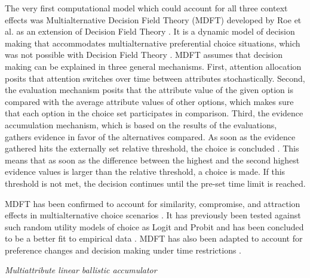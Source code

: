 \documentclass[a4paper,12pt]{article}
\newcommand{\citeyearonly}[1]{\citeyearpar{#1}}
\begin{document}
The very first computational model which could account for all three context effects was Multialternative Decision Field Theory (MDFT) developed by Roe et al. \citeyearonly{roe2001multialternative} as an extension of Decision Field Theory \citep{busemeyer1993decision}. It is a dynamic model of decision making that accommodates multialternative preferential choice situations, which was not possible with Decision Field Theory \citep{hotaling2019quantitative}. MDFT assumes that decision making can be explained in three general mechanisms. First, attention allocation posits that attention switches over time between attributes stochastically. Second, the evaluation mechanism posits that the attribute value of the given option is compared with the average attribute values of other options, which makes sure that each option in the choice set participates in comparison. Third, the evidence accumulation mechanism, which is based on the results of the evaluations, gathers evidence in favor of the alternatives compared. As soon as the evidence gathered hits the externally set relative threshold, the choice is concluded \citep{busemeyer2002survey}. This means that as soon as the difference between the highest and the second highest evidence values is larger than the relative threshold, a choice is made. If this threshold is not met, the decision continues until the pre-set time limit is reached.

MDFT has been confirmed to account for similarity, compromise, and attraction effects in multialternative choice scenarios \citep{roe2001multialternative}. It has previously been tested against such random utility models of choice as Logit and Probit and has been concluded to be a better fit to empirical data \citep{berkowitsch2014rigorously}. 
MDFT has also been adapted to account for preference changes \citep{mohr2017attraction} and decision making under time restrictions \citep{diederich2003mdft}.

\textit{Multiattribute linear ballistic accumulator}
\end{document}
